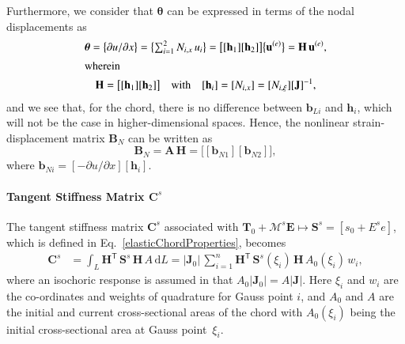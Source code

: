 Furthermore, we consider that $\boldsymbol{\theta}$ can be expressed in terms of the nodal displacements as
\begin{subequations}
    \begin{gather}
    \boldsymbol{\theta} =  \bigl\{
    \partial u / \partial x
    \bigr\}
    = \bigl\{ \begin{matrix}
    \sum\nolimits_{i=1}^2 N_{i,x} \, u_i
    \end{matrix} \bigr\}
    = \bigl[ [\mathbf{h}_1] [\mathbf{h}_2] \bigr] 
    \bigl\{ \mathbf{u}^{(e)} \bigr\}
    = \mathbf{H} \, \mathbf{u}^{(e)} ,\\
    \intertext{wherein}
    \mathbf{H} = \bigl[ [\mathbf{h}_1] [\mathbf{h}_2] \bigr]
    \quad \text{with} \quad
    [\mathbf{h}_i] = [N_{i,x}] = [N_{i,\xi}] [ \mathbf{J}]^{-1} ,
    \end{gather}
\end{subequations}
and we see that, for the chord, there is no difference between $\mathbf{b}_{Li}$ and $\mathbf{h}_i$, which will not be the case in higher-dimensional spaces.  Hence, the nonlinear strain-displacement matrix $\mathbf{B}_N$ can be written as
\begin{equation}
    \mathbf{B}_N = \mathbf{A} \, \mathbf{H}  =  
    \bigl[ [\mathbf{b}_{N1}] [\mathbf{b}_{N2}] \bigr] ,
\end{equation}
where $\mathbf{b}_{Ni} = [-\partial u / \partial x] [ \mathbf{h}_i ]$.

\paragraph{Tangent Stiffness Matrix $\mathbf{C}^s$}

The tangent stiffness matrix $\mathbf{C}^s$  associated with $\boldsymbol{T}_0 + 
\boldsymbol{\mathcal{M}}^s \boldsymbol{E} \mapsto \mathbf{S}^s = [ s_0 + E^s e ]$, which is defined in Eq.~\ref{elasticChordProperties}, becomes 
\begin{equation}
	\begin{aligned}
		\mathbf{C}^s & = \int_{L} \mathbf{H}^{\mathsf{T}} \,  \mathbf{S}^s \, \mathbf{H} \, A \, \mathrm{d} L
	     = | \mathbf{J}_0 |  \, \sum_{i=1}^{n} \mathbf{H}^{\mathsf{T}} \, \mathbf{S}^s (\xi_i) \, \mathbf{H} \, A_0 (\xi_i)  \, w_i ,
	\end{aligned}
\end{equation}
where an isochoric response is assumed in that $A_0 | \mathbf{J}_0 | = A | \mathbf{J} |$. Here $\xi_i$ and $w_i$ are the co-ordinates and weights of quadrature for Gauss point $i$, and $A_0$ and $A$ are the initial and current cross-sectional areas of the chord with $A_0 (\xi_i)$ being the initial cross-sectional area at Gauss point~$\xi_i$.


